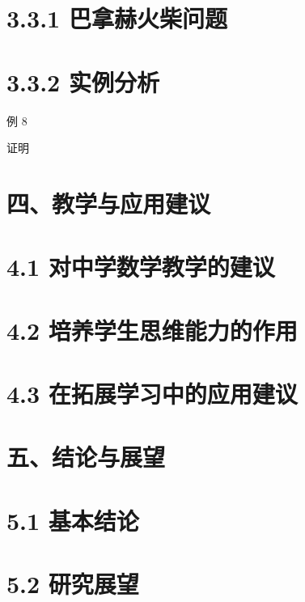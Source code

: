 
\section*{3.3.1 巴拿赫火柴问题}



\section*{3.3.2 实例分析}

例 8 

证明 

\section*{四、教学与应用建议}

\section*{4.1 对中学数学教学的建议}



\section*{4.2 培养学生思维能力的作用}



\section*{4.3 在拓展学习中的应用建议}



\section*{五、结论与展望}

\section*{5.1 基本结论}



\section*{5.2 研究展望}



